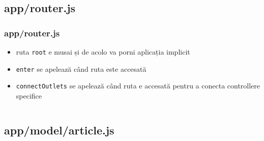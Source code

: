 \documentclass[compress]{beamer}
\begin{document}
\subsection{app/router.js}

\begin{frame}

\frametitle{app/router.js}

\begin{itemize}[<+->]
  \item ruta \texttt{root} e musai și de acolo va porni aplicația implicit
  \item \texttt{enter} se apelează când ruta este accesată
  \item \texttt{connectOutlets} se apelează când ruta e accesată pentru a conecta controllere specifice
\end{itemize}


\inputminted[fontsize=\tiny,gobble=2,linenos=true,firstline=6,lastline=29]{javascript}{code/js/app/router.js}

\end{frame}

\subsection{app/model/article.js}
\end{document}
